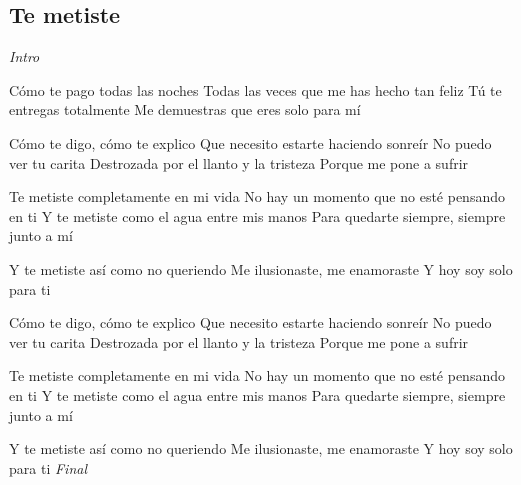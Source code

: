 \subsection{Te metiste}

\noindent
\vspace{1cm}

\begin{guitar}
	\begin{multicols}{2}
		\textit{Intro}\par
Cómo te pago todas las noches
Todas las veces que me has hecho tan feliz
Tú te entregas totalmente
Me demuestras que eres solo para mí

Cómo te digo, cómo te explico
Que necesito estarte haciendo sonreír
No puedo ver tu carita
Destrozada por el llanto y la tristeza
Porque me pone a sufrir

Te metiste completamente en mi vida
No hay un momento que no esté pensando en ti
Y te metiste como el agua entre mis manos
Para quedarte siempre, siempre junto a mí

Y te metiste así como no queriendo
Me ilusionaste, me enamoraste
Y hoy soy solo para ti

Cómo te digo, cómo te explico
Que necesito estarte haciendo sonreír
No puedo ver tu carita
Destrozada por el llanto y la tristeza
Porque me pone a sufrir

Te metiste completamente en mi vida
No hay un momento que no esté pensando en ti
Y te metiste como el agua entre mis manos
Para quedarte siempre, siempre junto a mí

Y te metiste así como no queriendo
Me ilusionaste, me enamoraste
Y hoy soy solo para ti
		\textit{Final}
	\end{multicols}
\end{guitar}
